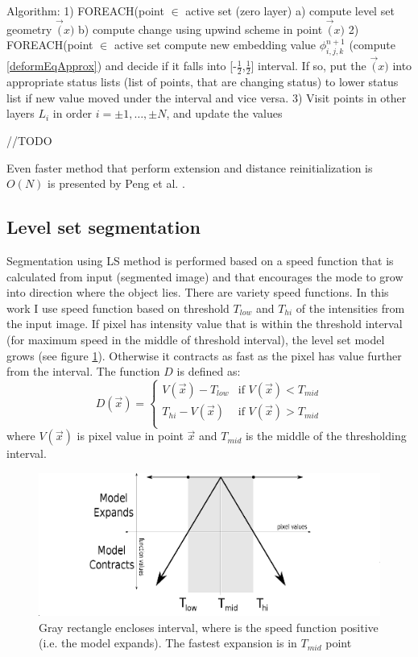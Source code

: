 Algorithm:
\label{alg:sparseFileld}
1) FOREACH(point $\in$ active set (zero layer)
  a) compute level set geometry $\vec(x)$
  b) compute change using upwind scheme in point $\vec(x)$
2) FOREACH(point $\in$ active set compute new embedding value
$\phi_{i,j,k}^{n+1}$ (compute \ref{deformEqApprox}) and decide if it falls into
[-$\frac{1}{2}$,$\frac{1}{2}$] interval. If so, put the $\vec(x)$ into
appropriate status lists (list of points, that are changing status) to lower
status list if new value moved under the interval and vice versa.
3) Visit points in other layers $L_i$ in order $i=\pm 1,\ldots, \pm N$, and
update the values

//TODO

Even faster method that perform extension and distance reinitialization is $O(N)$ is presented by Peng et al. \cite{pengSparseFields}.

\subsection{Level set segmentation}

Segmentation using LS method is performed based on a speed function that is calculated from input (segmented image) and that encourages the mode to grow into direction where the object lies.
There are variety speed functions. In this work I use speed function based on threshold $T_{low}$ and $T_{hi}$ of the intensities from the input image.
If pixel has intensity value that is within the threshold interval (for maximum speed in the middle of threshold interval), the level set model grows (see figure \ref{fg:speedFunction}).
Otherwise it contracts as fast as the pixel has value further from the interval. The function $D$ is defined as:
\begin{equation}
\label{eq:speedFunction}
D(\vec{x}) =
\begin{cases}
V(\vec{x}) - T_{low} & \text{if $V(\vec{x}) < T_{mid}$}\\
T_{hi} - V(\vec{x}) & \text{if $V(\vec{x}) > T_{mid}$}\\
\end{cases}
\end{equation}
where $V(\vec{x})$ is pixel value in point $\vec{x}$ and $T_{mid}$ is the middle of the thresholding interval.

\begin{figure}
    \centering
    \includegraphics[width=\textwidth]{data/speedFunction}
    \caption[Graph of thresholding based speed function]{Gray rectangle encloses interval, where is the speed function positive (i.e. the model expands). The fastest expansion is in $T_{mid}$ point}
    \label{fg:speedFunction}
\end{figure}

